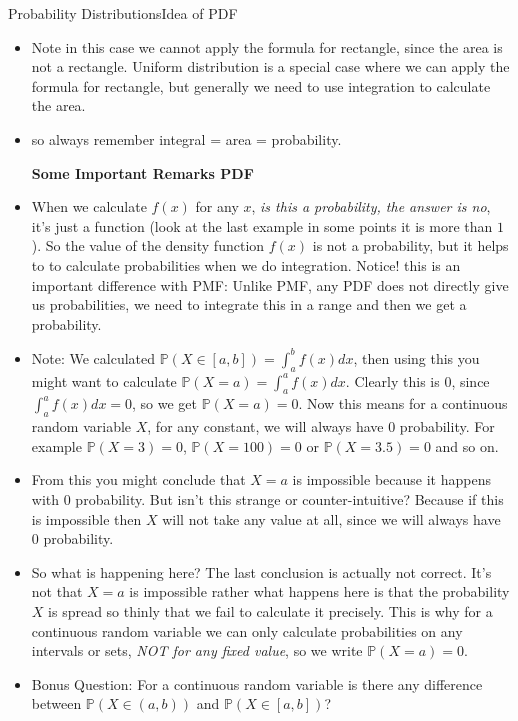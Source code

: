 \documentclass[8pt, usepdftitle = false]{beamer}
\begin{document}
\begin{frame}[allowframebreaks]{Probability Distributions}{Idea of PDF}
\begin{itemize}
\item Note in this case we cannot apply the formula for rectangle, since the area is not a rectangle. Uniform distribution is a special case where we can apply the formula for rectangle, but generally we need to use integration to calculate the area. 

\item so always remember integral = area = probability.



\framebreak

\textbf{Some Important Remarks PDF}

\item When we calculate $f(x)$ for any $x$, \emph{is this a probability, the answer is no}, it's just a function (look at the last example in some points it is more than $1$). So the value of the density function $f(x)$ is not a probability, but it helps to to calculate probabilities when we do integration. {\color{red} Notice! this is an important difference with PMF}: Unlike PMF, any  PDF does not directly give us probabilities, we need to integrate this in a range and then we get a probability. 




\item  Note: We calculated $\mathbb{P}(X \in [a, b]) = \int_{a}^{b} f(x) dx$, then using this you might want to calculate  $\mathbb{P}(X = a) = \int_{a}^{a} f(x) dx$. Clearly this is $0$, since $\int_{a}^{a} f(x) dx = 0$, so we get $\mathbb{P}(X=a)=0$. Now this means for a continuous random variable $X$, for any constant, we will always have $0$ probability. For example $\mathbb{P}(X = 3) = 0$, $\mathbb{P}(X = 100) = 0$ or $\mathbb{P}(X = 3.5) = 0$ and so on.

\item From this you might conclude that \alert{$X=a$ is impossible} because it happens with $0$ probability. But isn't this strange or counter-intuitive? Because if this is impossible then $X$ will not take any value at all, since we will always have $0$ probability.


\item So what is happening here? The last conclusion is actually not correct. It's not that \alert{$X=a$ is impossible} rather what happens here is that the probability $X$ is \alert{spread so thinly} that we fail to calculate it precisely. This is why for a continuous random variable we can only calculate probabilities on any intervals or sets, \emph{NOT for any fixed value}, so we write $\mathbb{P}(X = a) = 0$.


\item {\color{red} Bonus Question:} For a continuous random variable is there any difference between $\mathbb{P}(X \in (a, b))$ and $\mathbb{P}(X \in [a, b])$?  



\end{itemize}

\end{frame}
\end{document}
